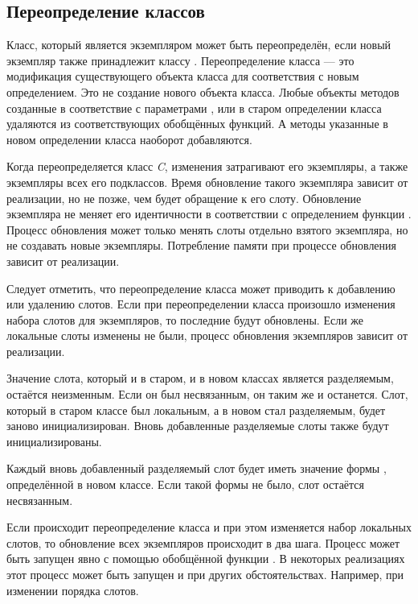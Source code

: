 \subsection{Переопределение классов}
\label{Redefining-Classes-SECTION}

Класс, который является экземпляром  может быть
переопределён, если новый экземпляр также принадлежит классу
. Переопределение класса --- это модификация существующего
объекта класса для соответствия с новым определением. Это не создание нового
объекта класса. Любые объекты методов созданные в соответствие с параметрами
,  или  в старом определении класса
удаляются из соответствующих обобщённых функций.
А методы указанные в новом определении класса наоборот добавляются.

Когда переопределяется класс \emph{C}, изменения затрагивают его экземпляры, а
также экземпляры всех его подклассов. Время обновление такого экземпляра зависит
от реализации, но не позже, чем будет обращение к его слоту. Обновление
экземпляра не меняет его идентичности в соответствии с определением функции
.
Процесс обновления может только менять слоты отдельно взятого экземпляра, но не
создавать новые экземпляры. Потребление памяти при процессе обновления зависит
от реализации.

Следует отметить, что переопределение класса может приводить к добавлению или
удалению слотов. Если при переопределении класса произошло изменения набора
слотов для экземпляров, то последние будут обновлены. Если же локальные слоты
изменены не были, процесс обновления экземпляров зависит от реализации.

Значение слота, который и в старом, и в новом классах является разделяемым,
остаётся неизменным. Если он был несвязанным, он таким же и останется. Слот,
который в старом классе был локальным, а в новом стал разделяемым, будет заново
инициализирован. Вновь добавленные разделяемые слоты также будут
инициализированы.

Каждый вновь добавленный разделяемый слот будет иметь значение формы
, определённой в новом классе. Если такой формы не было, слот
остаётся несвязанным.

Если происходит переопределение класса и при этом изменяется набор локальных
слотов, то обновление всех экземпляров происходит в два шага. Процесс может быть
запущен явно с помощью обобщённой функции . В
некоторых реализациях этот процесс может быть запущен и при других
обстоятельствах. Например, при изменении порядка слотов.

